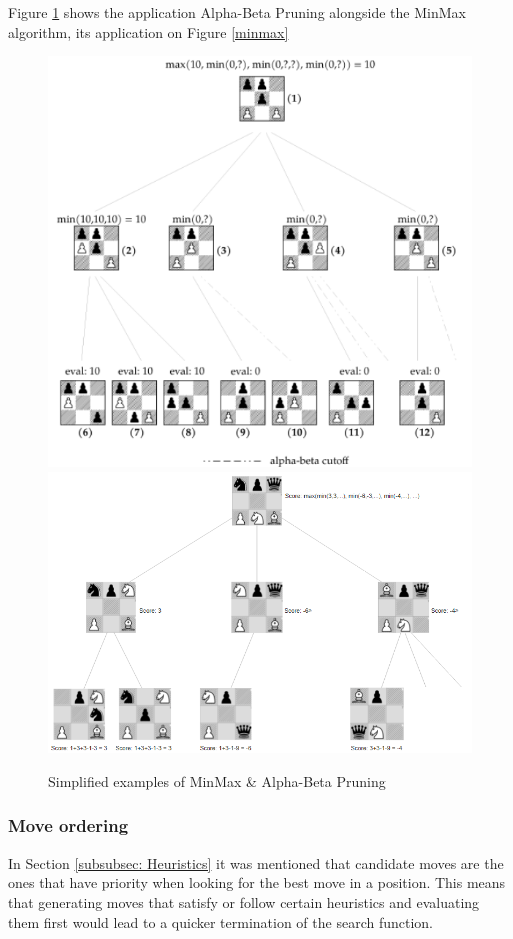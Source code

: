 Figure \ref{minAB} \cite{Klein} shows the application Alpha-Beta Pruning alongside the MinMax algorithm, its application on Figure \ref{minmax}

\begin{figure}[h]
    \centering
    \includegraphics[scale=0.45]{images/kleinPruneFig.png}
    \includegraphics[scale=0.40]{images/minMaxpruned.png}
    \caption{Simplified examples of MinMax \& Alpha-Beta Pruning}
    \label{minAB}
\end{figure}


\subsubsection{Move ordering}
In Section \ref{subsubsec: Heuristics} it was mentioned that candidate moves are the ones that have priority when looking for the best move in a position. This means that generating moves that satisfy or follow certain heuristics and evaluating them first would lead to a quicker termination of the search function.

